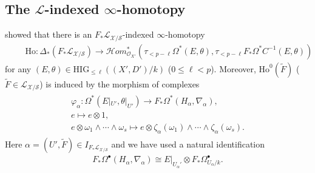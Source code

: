 \documentclass[12pt, a4paper]{article}
\begin{document}
\subsection{The $\mathcal L$-indexed $\infty$-homotopy}
\cite[Theorem 3.5]{SZ2} showed that there is an $F_*\mathcal L_{\mathcal X/\mathcal S}$-indexed $\infty$-homotopy
\begin{eqnarray}\label{F_*L indexed homotopy}
\qquad\mathrm{Ho}:\Delta_*(F_*\mathcal L_{\mathcal X/\mathcal S})\to\mathcal Hom^*_{\mathcal O_{X'}}(\tau_{<p-\ell}\Omega^*(E,\theta),\tau_{<p-\ell}F_*\Omega^*C^{-1}(E,\theta))
\end{eqnarray}
for any $(E,\theta)\in\mathrm{HIG}_{\leq\ell}((X',D')/k)$ ($0\leq\ell<p$). Moreover, $\mathrm{Ho}^0(\tilde F)$ ($\tilde F\in\mathcal L_{\mathcal X/\mathcal S}$) is induced by the morphism of complexes
\begin{eqnarray}\label{F_alpha}
\begin{array}{c}
\varphi_\alpha:\Omega^*(E|_{U'},\theta|_{U'})\to F_*\Omega^*(H_\alpha,\nabla_\alpha),\\
e\mapsto e\otimes 1,\\
e\otimes\omega_1\wedge\cdots\wedge\omega_s\mapsto e\otimes\zeta_\alpha(\omega_1)\wedge\cdots\wedge\zeta_\alpha(\omega_s).
\end{array}
\end{eqnarray}
Here $\alpha=(U',\tilde F)\in I_{F_*\mathcal L_{\mathcal X/\mathcal S}}$ and we have used a natural identification 
\begin{eqnarray}\label{identification}
F_*\Omega^\bullet(H_\alpha,\nabla_\alpha)\cong E|_{U_\alpha'}\otimes F_*\Omega^\bullet_{U_\alpha/k}.
\end{eqnarray}
\end{document}
